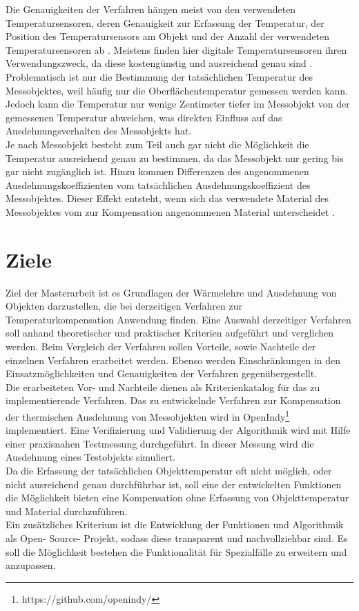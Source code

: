 Die Genauigkeiten der Verfahren hängen meist von den verwendeten Temperatursensoren, deren Genauigkeit zur Erfassung der Temperatur, der Position des Temperatursensors am Objekt und der Anzahl der verwendeten Temperatursensoren ab \cite{yuan1998} \cite{Mayr2012}. Meistens finden hier digitale Temperatursensoren ihren Verwendungszweck, da diese kostengünstig und ausreichend genau sind \cite{Fletcher2005}.\\
Problematisch ist nur die Bestimmung der tatsächlichen Temperatur des Messobjektes, weil häufig nur die Oberflächentemperatur gemessen werden kann. Jedoch kann die Temperatur nur wenige Zentimeter tiefer im Messobjekt von der gemessenen Temperatur abweichen, was direkten Einfluss auf das Ausdehnungsverhalten des Messobjekts hat. \\ Je nach Messobjekt besteht zum Teil auch gar nicht die Möglichkeit die Temperatur ausreichend genau zu bestimmen, da das Messobjekt nur gering bis gar nicht zugänglich ist.
Hinzu kommen Differenzen des angenommenen Ausdehnungskoeffizienten vom tatsächlichen Ausdehnungskoeffizient des Messobjektes. Dieser Effekt entsteht, wenn sich das verwendete Material des Messobjektes vom zur Kompensation angenommenen Material unterscheidet \cite{Bryan1965} \cite{Neumann08}. 


\chapter{Ziele}\label{chap:Ziele}

Ziel der Masterarbeit ist es Grundlagen der Wärmelehre und Ausdehnung von Objekten darzustellen, die bei derzeitigen Verfahren zur Temperaturkompensation Anwendung finden. Eine Auswahl derzeitiger Verfahren soll anhand theoretischer und praktischer Kriterien aufgeführt und verglichen werden. Beim Vergleich der Verfahren sollen Vorteile, sowie Nachteile der einzelnen Verfahren erarbeitet werden. Ebenso werden Einschränkungen in den Einsatzmöglichkeiten und Genauigkeiten der Verfahren gegenübergestellt. \\
Die erarbeiteten Vor- und Nachteile dienen als Kriterienkatalog für das zu implementierende Verfahren. Das zu entwickelnde Verfahren zur Kompensation der thermischen Ausdehnung von Messobjekten wird in OpenIndy\footnote{https://github.com/openindy/} implementiert.
Eine Verifizierung und Validierung der Algorithmik wird mit Hilfe einer praxisnahen Testmessung durchgeführt. In dieser Messung wird die Ausdehnung eines Testobjekts simuliert.\\
Da die Erfassung der tatsächlichen Objekttemperatur oft nicht möglich, oder nicht ausreichend genau durchführbar ist, soll eine der entwickelten Funktionen die Möglichkeit bieten eine Kompensation ohne Erfassung von Objekttemperatur und Material durchzuführen.\\
Ein zusätzliches Kriterium ist die Entwicklung der Funktionen und Algorithmik als Open- Source- Projekt, sodass diese transparent und nachvollziehbar sind. Es soll die Möglichkeit bestehen die Funktionalität für Spezialfälle zu erweitern und anzupassen.

